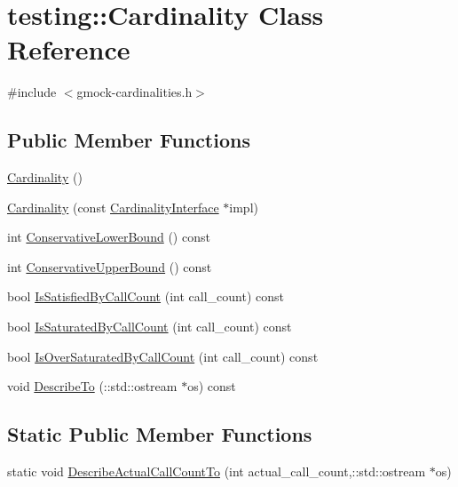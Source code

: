 \hypertarget{classtesting_1_1Cardinality}{}\section{testing\+:\+:Cardinality Class Reference}
\label{classtesting_1_1Cardinality}


{\ttfamily \#include $<$gmock-\/cardinalities.\+h$>$}

\subsection*{Public Member Functions}
\begin{DoxyCompactItemize}
\item 
\hyperlink{classtesting_1_1Cardinality_ab4b4066d7f5e9e3c7f851e49ab892cd9}{Cardinality} ()
\item 
\hyperlink{classtesting_1_1Cardinality_a10aed768b8a22d27110587444733771f}{Cardinality} (const \hyperlink{classtesting_1_1CardinalityInterface}{Cardinality\+Interface} $\ast$impl)
\item 
int \hyperlink{classtesting_1_1Cardinality_a7888bbbd2890b79671aecff37e94ef1d}{Conservative\+Lower\+Bound} () const 
\item 
int \hyperlink{classtesting_1_1Cardinality_a45a6f7b06ddaa645b9eb9b11ed84d732}{Conservative\+Upper\+Bound} () const 
\item 
bool \hyperlink{classtesting_1_1Cardinality_a8e43e216d44f98df7bc8dbce0a6057eb}{Is\+Satisfied\+By\+Call\+Count} (int call\+\_\+count) const 
\item 
bool \hyperlink{classtesting_1_1Cardinality_a3bafb8d0eea9b5884f685aa3fb24b33e}{Is\+Saturated\+By\+Call\+Count} (int call\+\_\+count) const 
\item 
bool \hyperlink{classtesting_1_1Cardinality_aba165c12fb9c48d03a18d4181d6d31f5}{Is\+Over\+Saturated\+By\+Call\+Count} (int call\+\_\+count) const 
\item 
void \hyperlink{classtesting_1_1Cardinality_aa111bb7e1eeb04849ede2166c5017893}{Describe\+To} (\+::std\+::ostream $\ast$os) const 
\end{DoxyCompactItemize}
\subsection*{Static Public Member Functions}
\begin{DoxyCompactItemize}
\item 
static void \hyperlink{classtesting_1_1Cardinality_aff07a924fe727a0ba82c5993c7d0883c}{Describe\+Actual\+Call\+Count\+To} (int actual\+\_\+call\+\_\+count,\+::std\+::ostream $\ast$os)
\end{DoxyCompactItemize}


